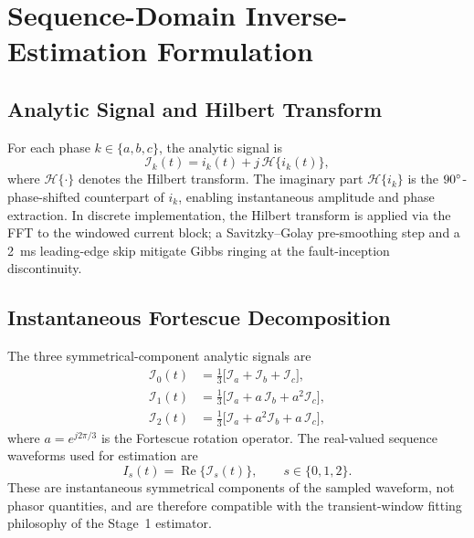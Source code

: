 \documentclass[10pt,journal,twoside]{IEEEtran}
\newcommand{\Hilb}{\mathcal{H}}
\newcommand{\Ical}{\mathcal{I}}
\begin{document}
\section{Sequence-Domain Inverse-Estimation Formulation}
\label{sec:formulation}

\subsection{Analytic Signal and Hilbert Transform}
\label{sec:formulation:analytic}

For each phase $k \in \{a, b, c\}$, the analytic signal is
\begin{equation}
\Ical_k(t) = i_k(t) + j\,\Hilb\{i_k(t)\},
\label{eq:analytic}
\end{equation}
where $\Hilb\{\cdot\}$ denotes the Hilbert transform.  The imaginary part
$\Hilb\{i_k\}$ is the $90\degree$-phase-shifted counterpart of $i_k$,
enabling instantaneous amplitude and phase extraction.  In discrete
implementation, the Hilbert transform is applied via the FFT to the
windowed current block; a Savitzky--Golay pre-smoothing step and a
2~ms leading-edge skip mitigate Gibbs ringing at the fault-inception
discontinuity.

\subsection{Instantaneous Fortescue Decomposition}
\label{sec:formulation:fortescue}

The three symmetrical-component analytic signals are
\begin{align}
\Ical_0(t) &= \tfrac{1}{3}\bigl[\Ical_a + \Ical_b + \Ical_c\bigr],
             \label{eq:I0}\\
\Ical_1(t) &= \tfrac{1}{3}\bigl[\Ical_a + a\,\Ical_b + a^2\Ical_c\bigr],
             \label{eq:I1}\\
\Ical_2(t) &= \tfrac{1}{3}\bigl[\Ical_a + a^2\Ical_b + a\,\Ical_c\bigr],
             \label{eq:I2}
\end{align}
where $a = e^{j2\pi/3}$ is the Fortescue rotation operator.
The real-valued sequence waveforms used for estimation are
\begin{equation}
I_s(t) = \operatorname{Re}\{\Ical_s(t)\}, \qquad s \in \{0,1,2\}.
\label{eq:seqwaveform}
\end{equation}
These are instantaneous symmetrical components of the sampled waveform,
not phasor quantities, and are therefore compatible with
the transient-window fitting philosophy of the Stage~1 estimator.
\end{document}
